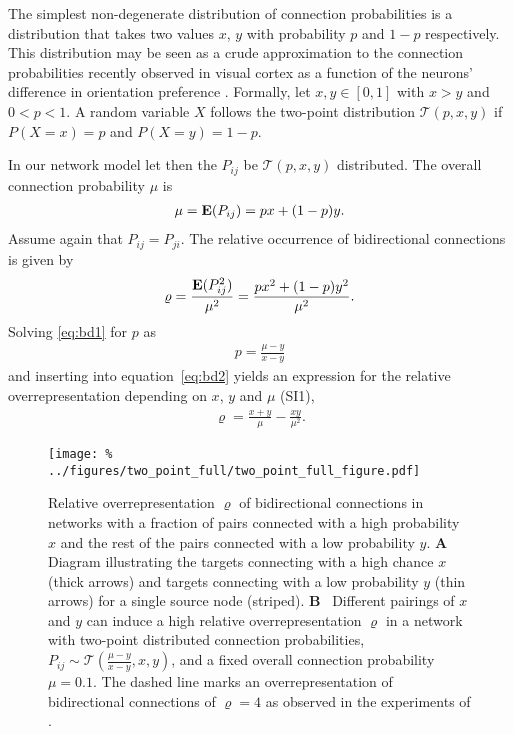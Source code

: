 
The simplest non-degenerate distribution of connection probabilities
is a distribution that takes two values $x$, $y$ with probability $p$
and $1-p$ respectively. %
%
This distribution may be seen as a crude approximation to the
connection probabilities recently observed in visual cortex as a
function of the neurons' difference in orientation preference
\cite{Lee2016}.
%
Formally, let $x,y \in [0,1]$ with $x > y$ and $0 < p
< 1$. A random variable $X$ follows the two-point distribution 
$\mathcal{T}(p,x,y)$ if $P(X=x)=p$ and $P(X=y) = 1-p$.
%

%
In our network model let then the $P_{ij}$ be $\mathcal{T}(p,x,y)$
distributed. The overall connection probability $\mu$ is
\begin{align}
\mu = \operatorname{\mathbf{E}}(P_{ij}) = px + (1-p)y. \label{eq:bd1}
\end{align}
Assume again that $P_{ij} = P_{ji}$. The relative occurrence of
bidirectional connections is given by
\begin{align}
  \varrho = \frac{\operatorname{\mathbf{E}}(P_{ij}^2)}{\mu^2} = \frac{p x^2 + (1-p) y^2}{\mu^2} \label{eq:bd2}.
\end{align}
Solving \eqref{eq:bd1} for $p$ as
\begin{align}
p = \frac{\mu - y}{x-y}
\end{align}
and inserting into
equation~\eqref{eq:bd2} yields an expression for the relative
overrepresentation depending on $x$, $y$ and $\mu$ (SI1),
\begin{align}
\varrho = \frac{x+y}{\mu} - \frac{xy}{\mu^2}.
\end{align}

\begin{figure}[h!]
\centering
\texttt{[image: \%
  ../figures/two\_point\_full/two\_point\_full\_figure.pdf]}
\caption{Relative overrepresentation $\varrho$ of bidirectional
  connections in networks with a fraction of pairs connected with a
  high probability $x$ and the rest of the pairs connected with a low
  probability $y$. \textbf{A}~ Diagram illustrating the targets
  connecting with a high chance $x$ (thick arrows) and targets
  connecting with a low probability $y$ (thin arrows) for a single
  source node (striped). \textbf{B}~ Different pairings of $x$ and $y$
  can induce a high relative overrepresentation $\varrho$ in a network
  with two-point distributed connection probabilities, $P_{ij} \sim
  \mathcal{T}(\frac{\mu-y}{x-y},x,y)$, and a fixed overall connection
  probability $\mu = 0.1$. The dashed line marks an overrepresentation
  of bidirectional connections of $\varrho=4$ as observed in the
  experiments of \textcite{Song2005}.}
\label{fig:tp}
\end{figure}

